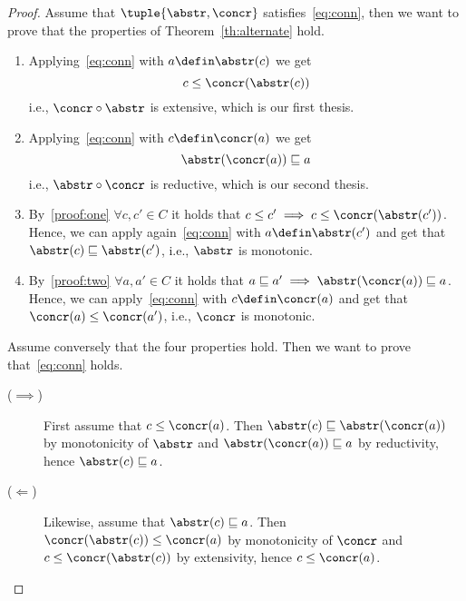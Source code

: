 \begin{proof}
  Assume that \(\tuple{\abstr,\concr}\) satisfies~\eqref{eq:conn},
  then we want to prove that the properties of
  Theorem~\ref{th:alternate} hold.
  \begin{enumerate}[label=(\arabic*)]
  \item\label{proof:one} Applying~\eqref{eq:conn} with
    \(a \defin \abstr(c)\) we get
    \begin{equation}
      c \leq \concr(\abstr(c))
    \end{equation}
    i.e., \(\concr \circ\abstr\) is extensive, which is our first
    thesis.
  \item\label{proof:two} Applying~\eqref{eq:conn} with
    \(c \defin\concr(a)\) we get
    \begin{equation}
      \abstr(\concr(a)) \sqsubseteq a
    \end{equation}
    i.e., \(\abstr\circ\concr\) is reductive, which is our second
    thesis.
  \item By~\ref{proof:one} \(\forall c, c'\in C\) it holds that
    \(c \leq c' \implies c \leq \concr(\abstr(c'))\). Hence, we can
    apply again~\eqref{eq:conn} with \(a \defin \abstr(c')\) and get
    that \(\abstr(c) \sqsubseteq \abstr(c')\), i.e., \(\abstr\) is
    monotonic.
  \item By~\ref{proof:two} \(\forall a, a'\in C\) it holds that
    \(a \sqsubseteq a' \implies \abstr(\concr(a)) \sqsubseteq
    a\). Hence, we can apply~\eqref{eq:conn} with
    \(c \defin \concr(a)\) and get that
    \(\concr(a)\leq\concr(a')\), i.e., \(\concr\) is
    monotonic.
  \end{enumerate}

  Assume conversely that the four properties hold. Then we want to
  prove that~\eqref{eq:conn} holds.
  \begin{description}
  \item[(\(\implies\))] First assume that \(c \leq
    \concr(a)\). Then \(\abstr(c) \sqsubseteq \abstr(\concr(a))\) by
    monotonicity of \(\abstr\) and \(\abstr(\concr(a)) \sqsubseteq a\)
    by reductivity, hence \(\abstr(c) \sqsubseteq a\).
  \item[(\(\Leftarrow\))] Likewise, assume that
    \(\abstr(c) \sqsubseteq a\). Then
    \(\concr(\abstr(c)) \leq \concr(a)\) by monotonicity of \(\concr\)
    and \(c \leq \concr(\abstr(c))\) by extensivity, hence
    \(c \leq \concr(a)\).
  \end{description}
\end{proof}

